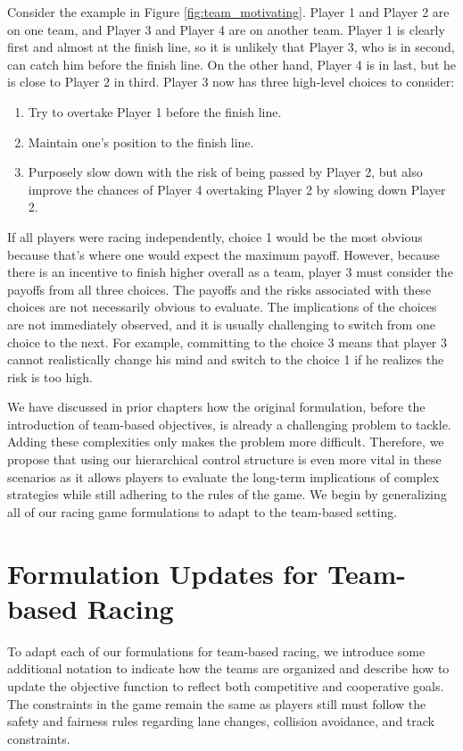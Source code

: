 Consider the example in Figure \ref{fig:team_motivating}. Player 1 and Player 2 are on one team, and Player 3 and Player 4 are on another team. Player 1 is clearly first and almost at the finish line, so it is unlikely that Player 3, who is in second, can catch him before the finish line. On the other hand, Player 4 is in last, but he is close to Player 2 in third. Player 3 now has three high-level choices to consider:
\begin{enumerate}
    \item Try to overtake Player 1 before the finish line.
    \item Maintain one's position to the finish line.
    \item Purposely slow down with the risk of being passed by Player 2, but also improve the chances of Player 4 overtaking Player 2 by slowing down Player 2.
\end{enumerate}
If all players were racing independently, choice 1 would be the most obvious because that's where one would expect the maximum payoff. However, because there is an incentive to finish higher overall as a team, player 3 must consider the payoffs from all three choices. The payoffs and the risks associated with these choices are not necessarily obvious to evaluate. The implications of the choices are not immediately observed, and it is usually challenging to switch from one choice to the next. For example, committing to the choice 3 means that player 3 cannot realistically change his mind and switch to the choice 1 if he realizes the risk is too high. 

We have discussed in prior chapters how the original formulation, before the introduction of team-based objectives, is already a challenging problem to tackle. Adding these complexities only makes the problem more difficult. Therefore, we propose that using our hierarchical control structure is even more vital in these scenarios as it allows players to evaluate the long-term implications of complex strategies while still adhering to the rules of the game. We begin by generalizing all of our racing game formulations to adapt to the team-based setting.

\section{Formulation Updates for Team-based Racing}
To adapt each of our formulations for team-based racing, we introduce some additional notation to indicate how the teams are organized and describe how to update the objective function to reflect both competitive and cooperative goals. The constraints in the game remain the same as players still must follow the safety and fairness rules regarding lane changes, collision avoidance, and track constraints.
